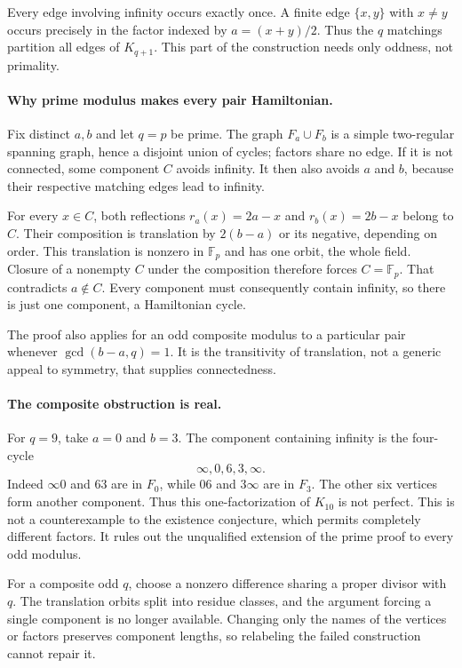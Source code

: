 \documentclass[11pt,a4paper]{article}
\begin{document}
Every edge involving infinity occurs exactly once. A finite edge $\{x,y\}$ with $x\ne y$ occurs precisely in the factor indexed by $a=(x+y)/2$. Thus the $q$ matchings partition all edges of $K_{q+1}$. This part of the construction needs only oddness, not primality.

\paragraph{Why prime modulus makes every pair Hamiltonian.}
Fix distinct $a,b$ and let $q=p$ be prime. The graph $F_a\cup F_b$ is a simple two-regular spanning graph, hence a disjoint union of cycles; factors share no edge. If it is not connected, some component $C$ avoids infinity. It then also avoids $a$ and $b$, because their respective matching edges lead to infinity.

For every $x\in C$, both reflections $r_a(x)=2a-x$ and $r_b(x)=2b-x$ belong to $C$. Their composition is translation by $2(b-a)$ or its negative, depending on order. This translation is nonzero in $\mathbb F_p$ and has one orbit, the whole field. Closure of a nonempty $C$ under the composition therefore forces $C=\mathbb F_p$. That contradicts $a\notin C$. Every component must consequently contain infinity, so there is just one component, a Hamiltonian cycle.

The proof also applies for an odd composite modulus to a particular pair whenever $\gcd(b-a,q)=1$. It is the transitivity of translation, not a generic appeal to symmetry, that supplies connectedness.

\paragraph{The composite obstruction is real.}
For $q=9$, take $a=0$ and $b=3$. The component containing infinity is the four-cycle
\[
\infty,0,6,3,\infty.
\]
Indeed $\infty0$ and $63$ are in $F_0$, while $06$ and $3\infty$ are in $F_3$. The other six vertices form another component. Thus this one-factorization of $K_{10}$ is not perfect. This is not a counterexample to the existence conjecture, which permits completely different factors. It rules out the unqualified extension of the prime proof to every odd modulus.

For a composite odd $q$, choose a nonzero difference sharing a proper divisor with $q$. The translation orbits split into residue classes, and the argument forcing a single component is no longer available. Changing only the names of the vertices or factors preserves component lengths, so relabeling the failed construction cannot repair it.
\end{document}

